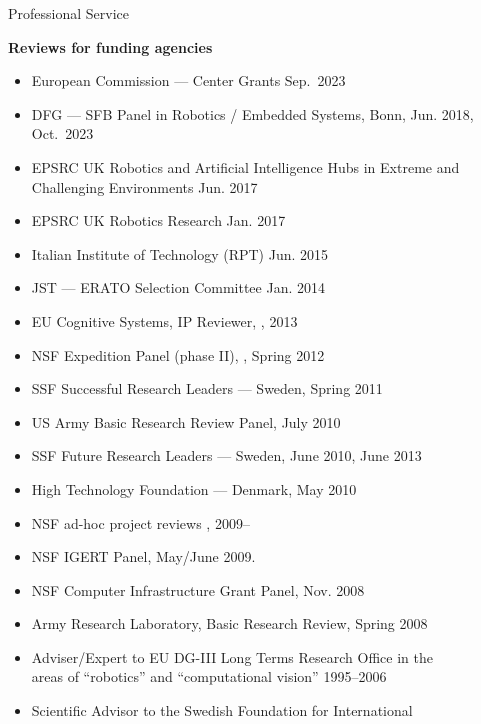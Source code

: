 \documentclass{article}
\begin{document}
\begin{cv}
\begin{cvlist}{Professional Service}
		\item {\bf Reviews for funding agencies}
		\begin{itemize}
			\item European Commission --- Center Grants \cftdotfill{\cftdotsep} Sep.~2023
			\item DFG --- SFB Panel in Robotics / Embedded Systems,
			      Bonn,\cftdotfill{\cftdotsep} Jun. 2018, Oct.~2023
			\item EPSRC UK Robotics and Artificial Intelligence Hubs in Extreme
			      and Challenging Environments \cftdotfill{\cftdotsep} Jun. 2017
			\item EPSRC UK Robotics Research  \cftdotfill{\cftdotsep} Jan. 2017
			\item Italian Institute of Technology (RPT) \cftdotfill{\cftdotsep}
			      Jun. 2015
			\item JST --- ERATO Selection Committee \cftdotfill{\cftdotsep} Jan. 2014
			\item EU Cognitive Systems, IP Reviewer, \cftdotfill{\cftdotsep}, 2013
			\item NSF Expedition Panel (phase II), \cftdotfill{\cftdotsep},
			      Spring 2012
			\item SSF Successful Research Leaders --- Sweden,
			      \cftdotfill{\cftdotsep} Spring 2011
			\item US Army Basic Research Review Panel, \cftdotfill{\cftdotsep} July 2010
			\item SSF Future Research Leaders --- Sweden, \cftdotfill{\cftdotsep} June 2010, June 2013
			\item High Technology Foundation --- Denmark, \cftdotfill{\cftdotsep}  May 2010
			\item NSF ad-hoc project reviews \cftdotfill{\cftdotsep}, 2009--
			\item NSF IGERT Panel, \cftdotfill{\cftdotsep} May/June 2009.
			\item NSF Computer Infrastructure Grant Panel,  \cftdotfill{\cftdotsep} Nov. 2008
			\item Army Research Laboratory, Basic Research Review, \cftdotfill{\cftdotsep}  Spring 2008
			\item Adviser/Expert to EU DG-III Long Terms Research Office in the\\
			      areas of ``robotics'' and ``computational vision''
			      \cftdotfill{\cftdotsep}  1995--2006
			\item Scientific Advisor to the Swedish Foundation for International\\

\end{itemize}
\end{cvlist}
\end{cv}
\end{document}
